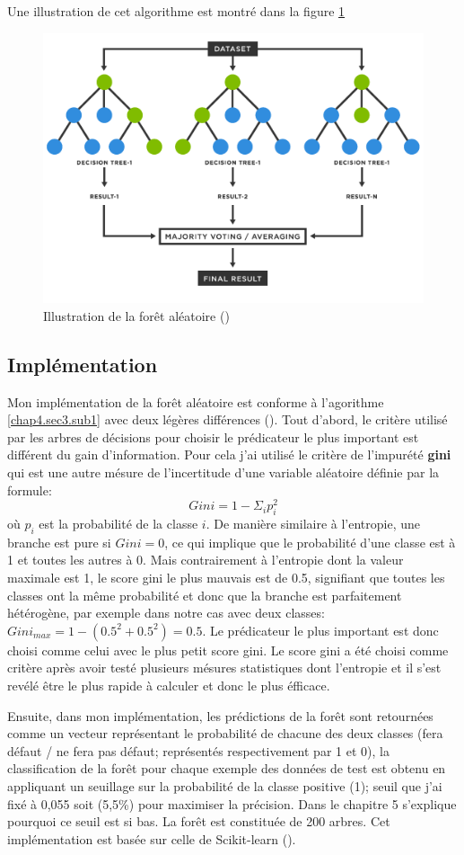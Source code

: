 Une illustration de cet algorithme est montré dans la figure \ref{fig:fig5}

\begin{figure}
    \centering
    \includegraphics[width=0.75\linewidth]{images/randomForest.png}
    \caption{Illustration de la forêt aléatoire (\cite{gunay2023random})}
    \label{fig:fig5}
\end{figure}

\subsection{Implémentation}
\label{chap4.sec3.sub2}
Mon implémentation de la forêt aléatoire est conforme à l'agorithme \ref{chap4.sec3.sub1} avec deux légères différences (\cite{diarra2024notebooks}). Tout d'abord, le critère utilisé par les arbres de décisions pour choisir le prédicateur le plus important est différent du gain d'information. Pour cela j'ai utilisé le critère de l'impurété \textbf{gini} qui est une autre mésure de l’incertitude d’une variable aléatoire définie par la formule: \[Gini = 1 - \Sigma_i p_i^2\] où \(p_i\) est la probabilité de la classe \(i\). De manière similaire à l'entropie, une branche est pure si \(Gini = 0\), ce qui implique que le probabilité d'une classe est à 1 et toutes les autres à 0. Mais contrairement à l'entropie dont la valeur maximale est 1, le score gini le plus mauvais est de 0.5, signifiant que toutes les classes ont la même probabilité et donc que la branche est parfaitement hétérogène, par exemple dans notre cas avec deux classes: \(Gini_{max} = 1 - (0.5^2 + 0.5^2) = 0.5\). Le prédicateur le plus important est donc choisi comme celui avec le plus petit score gini. Le score gini a été choisi comme critère après avoir testé plusieurs mésures statistiques dont l'entropie et il s'est revélé être le plus rapide à calculer et donc le plus éfficace.

Ensuite, dans mon implémentation, les prédictions de la forêt sont retournées comme un vecteur représentant le probabilité de chacune des deux classes (fera défaut / ne fera pas défaut; représentés respectivement par 1 et 0), la classification de la forêt pour chaque exemple des données de test est obtenu en appliquant un seuillage sur la probabilité de la classe positive (1); seuil que j'ai fixé à 0,055 soit (5,5\%) pour maximiser la précision. Dans le chapitre 5 s'explique pourquoi ce seuil est si bas. La forêt est constituée de 200 arbres. Cet implémentation est basée sur celle de Scikit-learn (\cite{scikit-learn}).